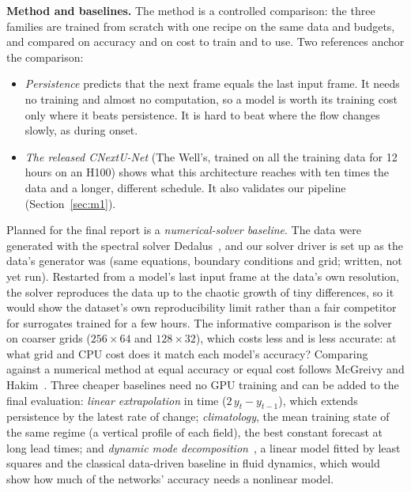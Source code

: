 \documentclass[11pt]{article}
\begin{document}
\textbf{Method and baselines.} The method is a controlled comparison: the three families are trained from scratch
with one recipe on the same data and budgets, and compared on accuracy and on cost to train and to use. Two
references anchor the comparison:
\begin{itemize}
    \item \emph{Persistence} predicts that the next frame equals the last input frame. It needs no training and
    almost no computation, so a model is worth its training cost only where it beats persistence. It is hard to
    beat where the flow changes slowly, as during onset.
    \item \emph{The released CNextU-Net} (The Well's, trained on all the training data for 12 hours on an H100)
    shows what this architecture reaches with ten times the data and a longer, different schedule. It also
    validates our pipeline (Section~\ref{sec:m1}).
\end{itemize}
Planned for the final report is a \emph{numerical-solver baseline}. The data were generated with the spectral
solver Dedalus~\cite{burns2020dedalus}, and our solver driver is set up as the data's generator was (same
equations, boundary conditions and grid; written, not yet run). Restarted from a model's last input frame at the
data's own resolution, the solver reproduces the data up to the chaotic growth of tiny differences, so it would show
the dataset's own reproducibility limit rather than a fair competitor for surrogates trained for a few hours. The
informative comparison is the solver on coarser grids ($256\times64$ and $128\times32$), which costs less and is
less accurate: at what grid and CPU cost does it match each model's accuracy? Comparing against a numerical method
at equal accuracy or equal cost follows McGreivy and Hakim~\cite{mcgreivy2024weak}. Three cheaper baselines need no
GPU training and can be added to the final evaluation: \emph{linear extrapolation} in time ($2\,y_t-y_{t-1}$),
which extends persistence by the latest rate of change; \emph{climatology}, the mean training state of the same
regime (a vertical profile of each field), the best constant forecast at long lead times; and \emph{dynamic mode
decomposition}~\cite{schmid2010dmd}, a linear model fitted by least squares and the classical data-driven baseline in
fluid dynamics, which would show how much of the networks' accuracy needs a nonlinear model.

\FloatBarrier
\end{document}
